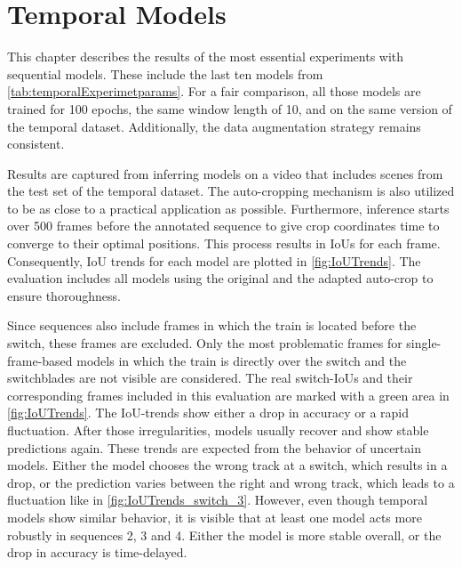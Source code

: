\section{Temporal Models}
\label{sec:temporalModelsResults}

This chapter describes the results of the most essential experiments with sequential models.
These include the last ten models from \autoref{tab:temporalExperimetparams}.
For a fair comparison, all those models are trained for 100 epochs, the same window length of 10, and on the same version of the temporal dataset.
Additionally, the data augmentation strategy remains consistent.

Results are captured from inferring models on a video that includes scenes from the test set of the temporal dataset.
The auto-cropping mechanism is also utilized to be as close to a practical application as possible.
Furthermore, inference starts over 500 frames before the annotated sequence to give crop coordinates time to converge to their optimal positions.
This process results in \ac{IoU}s for each frame.
Consequently, \ac{IoU} trends for each model are plotted in \autoref{fig:IoUTrends}.
The evaluation includes all models using the original and the adapted auto-crop to ensure thoroughness.

Since sequences also include frames in which the train is located before the switch, these frames are excluded.
Only the most problematic frames for single-frame-based models in which the train is directly over the switch and the switchblades are not visible are considered.
The real switch-\ac{IoU}s and their corresponding frames included in this evaluation are marked with a green area in \autoref{fig:IoUTrends}.
The \ac{IoU}-trends show either a drop in accuracy or a rapid fluctuation.
After those irregularities, models usually recover and show stable predictions again.
These trends are expected from the behavior of uncertain models.
Either the model chooses the wrong track at a switch, which results in a drop, or the prediction varies between the right and wrong track, which leads to a fluctuation like in \autoref{fig:IoUTrends_switch_3}.
However, even though temporal models show similar behavior, it is visible that at least one model acts more robustly in sequences 2, 3 and 4.
Either the model is more stable overall, or the drop in accuracy is time-delayed.

